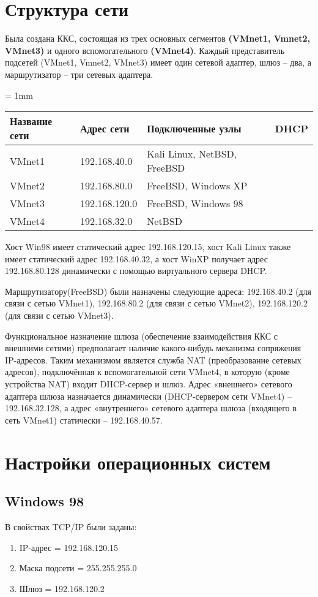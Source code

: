 \documentclass[a4paper, 12pt]{article}		%
\newcommand{\cmark}{\ding{52}}%
\newcommand{\xmark}{\ding{56}}
\begin{document}
\section{Структура сети}
Была создана ККС, состоящая из трех основных сегментов \textbf{(VMnet1, Vmnet2, VMnet3)} и одного вспомогательного \textbf{(VMnet4)}. Каждый представитель подсетей (VMnet1, Vmnet2, VMnet3) имеет один сетевой адаптер, шлюз – два, а маршрутизатор – три сетевых адаптера.

\tabulinesep = 1mm
\begin{longtabu} to \textwidth {|X[ c , m ] |X[ c , m ] | X[2, c , m ]|X[c , m ]|}\firsthline\hline

\textbf{Название сети}&\textbf{Адрес сети}&\textbf{Подключенные узлы}&\textbf{DHCP}\\ \hline \endfirsthead	
VMnet1&192.168.40.0&Kali Linux, NetBSD, FreeBSD&\xmark\\ \hline
VMnet2&192.168.80.0&FreeBSD, Windows XP&\cmark\\ \hline
VMnet3&192.168.120.0&FreeBSD, Windows 98&\xmark\\ \hline
VMnet4&192.168.32.0&NetBSD&\cmark\\ \hline
\end{longtabu}

Хост Win98 имеет статический адрес 192.168.120.15, хост Kali Linux также имеет статический адрес 192.168.40.32, а хост WinXP получает адрес 192.168.80.128 динамически с помощью виртуального сервера DHCP.

Маршрутизатору(FreeBSD) были назначены следующие адреса: 192.168.40.2 (для связи с сетью VMnet1), 192.168.80.2 (для связи с сетью VMnet2), 192.168.120.2 (для связи с сетью VMnet3).

Функциональное назначение шлюза (обеспечение взаимодействия ККС с внешними сетями) предполагает наличие какого-нибудь механизма сопряжения IP-адресов. Таким механизмом является служба NAT (преобразование сетевых адресов), подключённая к вспомогательной сети VMnet4, в которую (кроме устройства NAT) входит DHCP-сервер и шлюз. Адрес «внешнего» сетевого адаптера шлюза назначается динамически (DHCP-сервером сети VMnet4) – 192.168.32.128, а адрес «внутреннего» сетевого адаптера шлюза (входящего в сеть VMnet1) статически – 192.168.40.57.


\section{Настройки операционных систем}
\subsection{Windows 98}
В свойствах TCP/IP были заданы:
\begin{enumerate}
\item IP-адрес = 192.168.120.15
\item Маска подсети = 255.255.255.0
\item Шлюз = 192.168.120.2
\end{enumerate}
\end{document}
